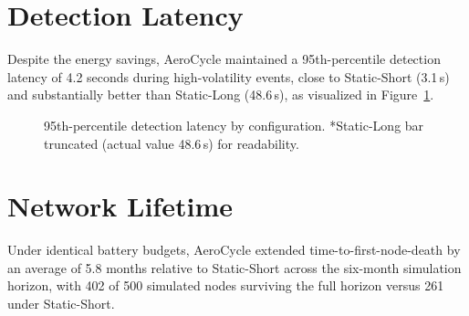 \documentclass[12pt,a4paper]{report}
\begin{document}
\section{Detection Latency}
Despite the energy savings, AeroCycle maintained a 95th-percentile detection latency of
4.2 seconds during high-volatility events, close to Static-Short (3.1\,s) and substantially
better than Static-Long (48.6\,s), as visualized in Figure~\ref{fig:latency}.

\begin{figure}[H]
\centering
{}
\caption{95th-percentile detection latency by configuration. *Static-Long bar truncated (actual value 48.6\,s) for readability.}
\label{fig:latency}
\end{figure}

\section{Network Lifetime}
Under identical battery budgets, AeroCycle extended time-to-first-node-death by an average of
5.8 months relative to Static-Short across the six-month simulation horizon, with 402 of 500
simulated nodes surviving the full horizon versus 261 under Static-Short.
\end{document}
